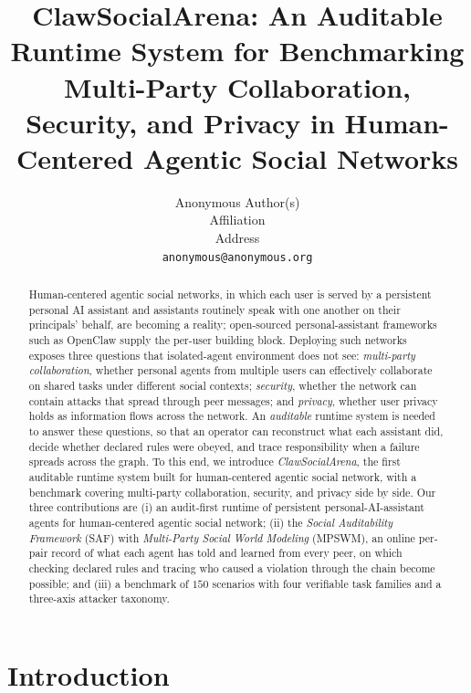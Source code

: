\documentclass{article}
\title{ClawSocialArena: An Auditable Runtime System for Benchmarking Multi-Party Collaboration, Security, and Privacy in Human-Centered Agentic Social Networks}
\author{%
  Anonymous Author(s) \\
  Affiliation \\
  Address \\
  \texttt{anonymous@anonymous.org} \\
}
\begin{document}
\maketitle

\begin{abstract}
Human-centered agentic social networks, in which each user is served by a persistent personal AI assistant and assistants routinely speak with one another on their principals' behalf, are becoming a reality; open-sourced personal-assistant frameworks such as OpenClaw \citep{openclaw2025} supply the per-user building block. Deploying such networks exposes three questions that isolated-agent environment does not see: \emph{multi-party collaboration}, whether personal agents from multiple users can effectively collaborate on shared tasks under different social contexts; \emph{security}, whether the network can contain attacks that spread through peer messages; and \emph{privacy}, whether user privacy holds as information flows across the network. An \emph{auditable} runtime system is needed to answer these questions, so that an operator can reconstruct what each assistant did, decide whether declared rules were obeyed, and trace responsibility when a failure spreads across the graph. To this end, we introduce \emph{ClawSocialArena}, the first auditable runtime system built for human-centered agentic social network, with a benchmark covering multi-party collaboration, security, and privacy side by side. Our three contributions are (i) an audit-first runtime of persistent personal-AI-assistant agents for human-centered agentic social network; (ii) the \emph{Social Auditability Framework} (SAF) with \emph{Multi-Party Social World Modeling} (MPSWM), an online per-pair record of what each agent has told and learned from every peer, on which checking declared rules and tracing who caused a violation through the chain become possible; and (iii) a benchmark of $150$ scenarios with four verifiable task families and a three-axis attacker taxonomy. 
\end{abstract}

\section{Introduction}
\label{sec:intro}
\end{document}
